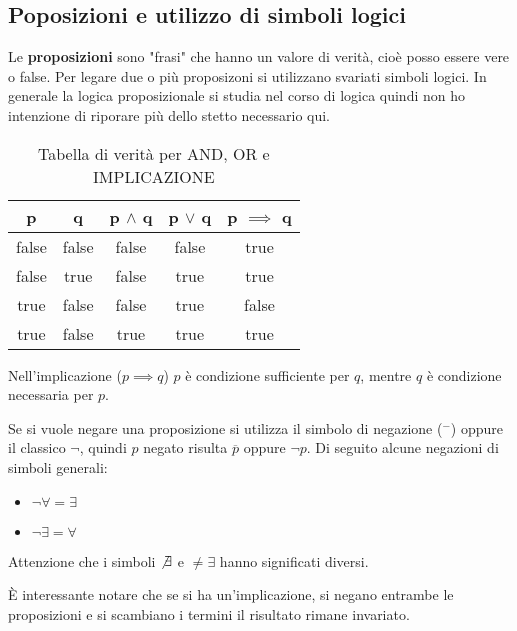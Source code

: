 \subsection{Poposizioni e utilizzo di simboli logici}

Le \textbf{proposizioni} sono "frasi" che hanno un valore di verità, cioè posso essere vere o false. Per legare due o più proposizoni si utilizzano svariati simboli logici. In generale la logica proposizionale si studia nel corso di logica quindi non ho intenzione di riporare più dello stetto necessario qui.

\begin{table}[H]
\centering
\begin{tabular}{|cc|c|c|c|}
\hline
p & q & \multicolumn{1}{l|}{p $\land$ q} & \multicolumn{1}{l|}{p $\lor$ q} & \multicolumn{1}{l|}{p $\implies$ q} \\ \hline
{\color[HTML]{000000} false} & {\color[HTML]{000000} false} & false & false & true \\
{\color[HTML]{000000} false} & {\color[HTML]{000000} true} & false & true & true \\
{\color[HTML]{000000} true} & {\color[HTML]{000000} false} & false & true & false \\
true & false & true & true & true \\ \hline
\end{tabular}

\caption{Tabella di verità per AND, OR e IMPLICAZIONE}
\end{table}

Nell'implicazione ($p \implies q$) $p$ è condizione sufficiente per $q$, mentre $q$ è condizione necessaria per $p$.

Se si vuole negare una proposizione si utilizza il simbolo di negazione ($^-$) oppure il classico $\neg$, quindi $p$ negato risulta $\overline{p}$ oppure $\neg p$. Di seguito alcune negazioni di simboli generali:
\begin{itemize}
    \item $\neg \forall = \exists$
    \item $\neg \exists = \forall$
\end{itemize}
Attenzione che i simboli $\not \exists$ e $\neq \exists$ hanno significati diversi. 

È interessante notare che se si ha un'implicazione, si negano entrambe le proposizioni e si scambiano i termini il risultato rimane invariato.

